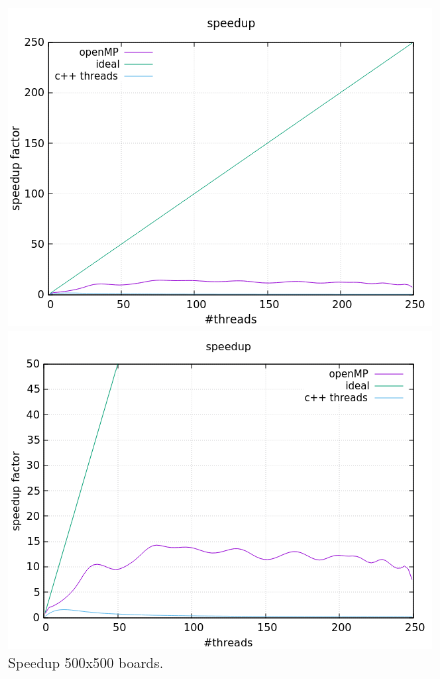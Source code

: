 \documentclass[a4paper,10pt]{article}
\begin{document}
\begin{figure}[H]
	\centering
	\begin{minipage}[t]{0.55\linewidth}
		\includegraphics[width=\linewidth]{500_standard_speed.png}
	\end{minipage}%
	\begin{minipage}[t]{0.55\linewidth}
		\includegraphics[width=\linewidth]{500_zoomed_speed.png}
	\end{minipage}
	\caption{Speedup 500x500 boards.}
	\label{500}
\end{figure}
\end{document}

